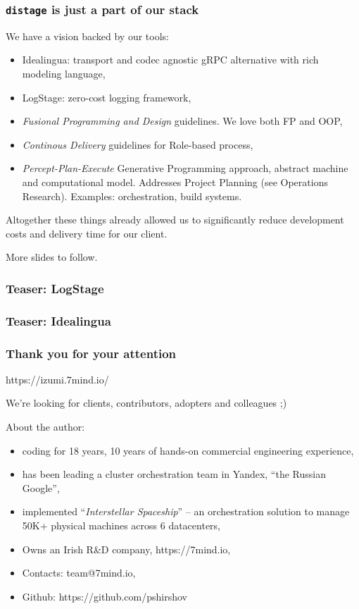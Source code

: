 \documentclass[usenames,dvipsnames]{beamer}
\newcommand{\distage}{\texttt{distage}\xspace}
\begin{document}
\begin{frame}
\frametitle{\distage is just a part of our stack}
We have a vision backed by our tools:
\begin{itemize}
\item Idealingua: transport and codec agnostic gRPC alternative with rich modeling language,
\item LogStage: zero-cost logging framework,
\item \textit{Fusional Programming and Design} guidelines. We love both FP and OOP,
\item \textit{Continous Delivery} guidelines for Role-based process, 
\item \textit{Percept-Plan-Execute} Generative Programming approach, abstract machine and computational model.
Addresses Project Planning (see Operations Research). Examples: orchestration, build systems.
\end{itemize}

Altogether these things already allowed us to significantly reduce development costs and
delivery time for our client.\newline

More slides to follow.
\end{frame}

\begin{frame}
\frametitle{Teaser: LogStage}
\end{frame}

\begin{frame}
\frametitle{Teaser: Idealingua}
\end{frame}


\begin{frame}
    \frametitle{Thank you for your attention}

    \begin{center}
      https://izumi.7mind.io/

      We're looking for clients, contributors, adopters and colleagues ;)
    \end{center}

    About the author:
    \begin{itemize}
        \item coding for 18 years, 10 years of hands-on commercial engineering experience,
        \item has been leading a cluster orchestration team in Yandex, ``the Russian Google'',
        \item implemented ``\textit{Interstellar Spaceship}'' -- an orchestration solution to manage 50K+ physical machines across 6 datacenters,
        \item Owns an Irish R\&D company, https://7mind.io,
        \item Contacts: team@7mind.io,
        \item Github: https://github.com/pshirshov
    \end{itemize}
\end{frame}
\end{document}
